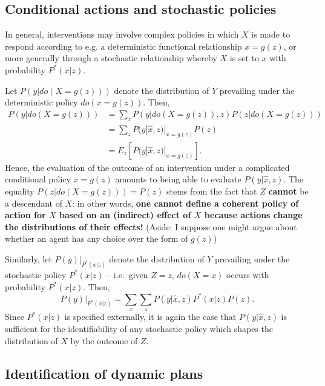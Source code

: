 \documentclass[11pt]{article}
\numberwithin{equation}{section}
\begin{document}
\subsection{Conditional actions and stochastic policies}
In general, interventions may involve complex policies in which $X$ is made to respond according to e.g. a deterministic functional relationship $x=g(z)$, or more generally through a stochastic relationship whereby $X$ is set to $x$ with probability $P^*(x|z)$. 


Let $P(y|do(X=g(z)))$ denote the distribution of $Y$ prevailing under the deterministic policy $do(x=g(z))$. Then,
\begin{align}
P(y|do(X=g(z))) &= \sum_z P(y|do(X=g(z)),z) P(z|do(X=g(z))) \\
&= \sum_z P(y|\hat{x}, z)|_{x=g(z)} P(z) \nonumber \\
&= E_z[P(y|\hat{x},z)|_{x=g(z)}]. \nonumber
\end{align}
Hence, the evaluation of the outcome of an intervention under a complicated conditional policy $x=g(z)$ amounts to being able to evaluate $P(y|\hat{x},z)$. The equality $P(z|do(X=g(z))) = P(z)$ stems from the fact that $Z$ \textbf{cannot} be a descendant of $X$: in other words, \textbf{one cannot define a coherent policy of action for $X$ based on an (indirect) effect of $X$ because actions change the distributions of their effects!} (Aside: I suppose one might argue about whether an agent has any choice over the form of $g(z)$)

Similarly, let $P(y)|_{P^*(x|z)}$ denote the distribution of $Y$ prevailing under the stochastic policy $P^*(x|z)$ -- i.e.\ given $Z=z$, $do(X=x)$  occurs with probability $P^*(x|z)$. Then,
\begin{equation}
P(y)|_{P^*(x|z)} = \sum_x \sum_z P(y|\hat{x}, z) P^*(x|z) P(z).
\end{equation}
Since $P^*(x|z)$ is specified externally, it is again the case that $P(y|\hat{x}, z)$ is sufficient for the identifiability of any stochastic policy which shapes the distribution of $X$ by the outcome of $Z$.


\subsection{Identification of dynamic plans}
\end{document}
